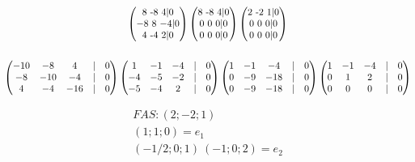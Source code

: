 \documentclass[12pt]{article}
\begin{document}
\begin{gather*}
	\begin{pmatrix} %
		8 $ -8 $ 4  | 0 \\
		-8 $ 8 $ -4 | 0 \\
		4 $ -4 $ 2 | 0 \\
	\end{pmatrix} 
	\begin{pmatrix}
		8 $ -8 $ 4  | 0 \\
		0 $ 0 $ 0 | 0 \\
		0 $ 0 $ 0 | 0 \\
	\end{pmatrix}
	\begin{pmatrix}
		2 $ -2 $ 1  | 0 \\
		0 $ 0 $ 0 | 0 \\
		0 $ 0 $ 0 | 0 \\
	\end{pmatrix} %
	\\
	\\
	\begin{pmatrix}
		-10 & -8 & 4 & | & 0 \\
		-8 & -10 & -4 & | & 0 \\
		4& -4 & -16 & | & 0 \\
	\end{pmatrix}
	\begin{pmatrix}
		1 & -1 & -4 & | & 0 \\
		-4 & -5 & -2 & | & 0 \\
		-5 & -4 & 2 & | & 0 \\
	\end{pmatrix}
	\begin{pmatrix}
		1 & -1 & -4 & | & 0 \\
		0 & -9 & -18 & | & 0 \\
		0 & -9 & -18 & | & 0 \\
	\end{pmatrix}
	\begin{pmatrix}
		1 & -1 & -4 & | & 0 \\
		0 & 1 & 2 & | & 0 \\
		0 & 0 & 0 & | & 0 \\
	\end{pmatrix}
\end{gather*}

\begin{gather*}
	FAS: %
	(2; -2; 1) \\
	(1;1;0) = e_1 \\
	(-1/2; 0; 1) ~ (-1;0;2) = e_2%
\end{gather*}
\end{document}

